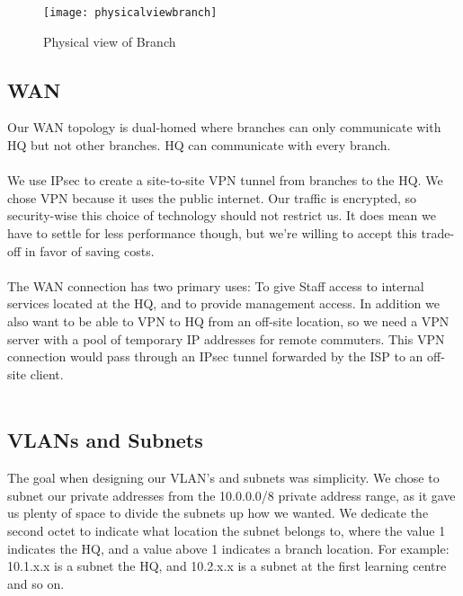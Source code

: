 \begin{figure}[H]
\caption{Physical view of Branch}
\centering
\texttt{[image: physicalviewbranch]}
\label{physicalviewbranch}
\end{figure}


\subsection{WAN}

Our WAN topology is dual-homed where branches can only communicate with HQ but not other branches. HQ can communicate with every branch. 
\\
\\
We use IPsec to create a site-to-site VPN tunnel from branches to the HQ. We chose VPN because it uses the public internet. Our traffic is encrypted, so security-wise this choice of technology should not restrict us. It does mean we have to settle for less performance though, but we're willing to accept this trade-off in favor of saving costs.
\\
\\
The WAN connection has two primary uses: To give Staff access to internal services located at the HQ, and to provide management access. In addition we also want to be able to VPN to HQ from an off-site location, so we need a VPN server with a pool of temporary IP addresses for remote commuters. This VPN connection would pass through an IPsec tunnel forwarded by the ISP to an off-site client.
\\
\\


\subsection{VLANs and Subnets}

The goal when designing our VLAN's and subnets was simplicity. We chose to subnet our private addresses from the 10.0.0.0/8 private address range, as it gave us plenty of space to divide the subnets up how we wanted. We dedicate the second octet to indicate what location the subnet belongs to, where the value 1 indicates the HQ, and a value above 1 indicates a branch location. For example: 10.1.x.x is a subnet the HQ, and 10.2.x.x is a subnet at the first learning centre and so on.

